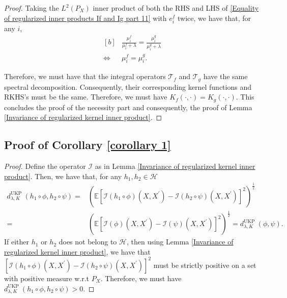 \documentclass[11pt]{article}
\newcommand{\E}{\mathbb{E}}
\newcommand{\repone}{\phi}
\newcommand{\reptwo}{\psi}
\newcommand{\LPtwo}{L^{2}(P_{X})}
\newcommand{\metricstname}{UKP }
\theoremstyle{plain}
\begin{document}
\begin{proof}
    Taking the $\LPtwo$ inner product of both the RHS and LHS of \eqref{Equality of regularized inner products If and Ig part 11} with $e_{i}^{f}$ twice, we have that, for any $i$,
    \begin{equation*}
        \begin{aligned}[b]
            &\frac{\mu_{i}^{f}}{\mu_{i}^{f} + \lambda} = \frac{\mu_{i}^{g}}{\mu_{i}^{g} + \lambda}\\
            \iff & \mu_{i}^{f} = \mu_{i}^{g}.
        \end{aligned}
    \end{equation*}

    Therefore, we must have that the integral operators $\mathcal{T}_{f}$ and $\mathcal{T}_{g}$ have the same spectral decomposition. Consequently, their corresponding kernel functions and RKHS's must be the same. Therefore, we must have $ K_{f}(\cdot, \cdot) = K_{g}(\cdot, \cdot)$. This concludes the proof of the necessity part and consequently, the proof of Lemma \ref{Invariance of regularized kernel inner product}.
\end{proof}

\subsection{Proof of Corollary \ref{corollary 1}} \label{Proof of Corollary 1}

\begin{proof}
    Define the operator $\mathcal{I}$ as in Lemma \ref{Invariance of regularized kernel inner product}. Then, we have that, for any $h_{1},h_{2} \in \mathcal{H}$
    \[
    \begin{aligned}
         d_{\lambda,K}^{\text{\metricstname}}(h_{1} \circ \repone,h_{2} \circ \reptwo)
        =& \left(\E\left[\mathcal{I}(h_{1} \circ \repone)(X,X^{\prime}) - \mathcal{I}(h_{2} \circ \reptwo)(X,X^{\prime})\right]^{2}\right)^{\frac{1}{2}}\\
        =& \left(\E\left[\mathcal{I}(\repone)(X,X^{\prime}) - \mathcal{I}(\reptwo)(X,X^{\prime})\right]^{2}\right)^{\frac{1}{2}}
        = d_{\lambda,K}^{\text{\metricstname}}(\repone,\reptwo).
    \end{aligned}
    \]
If either $h_{1}$ or $h_{2}$ does not belong to $\mathcal{H}$, then using Lemma \ref{Invariance of regularized kernel inner product}, we have that \\$\left[\mathcal{I}(h_{1} \circ \repone)(X,X^{\prime}) - \mathcal{I}(h_{2} \circ \reptwo)(X,X^{\prime})\right]^{2}$ must be strictly positive on a set with positive measure w.r.t $P_{X}$. Therefore, we must have $d_{\lambda,K}^{\text{\metricstname}}(h_{1} \circ \repone,h_{2} \circ \reptwo) > 0$.
\end{proof}
\end{document}
